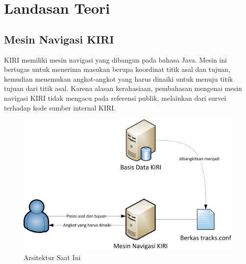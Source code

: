 \chapter{Landasan Teori}
\label{chap:pendahuluan}

\section{Mesin Navigasi KIRI}
\label{sec:mesin_navigasi_kiri}

KIRI memiliki mesin navigasi yang dibangun pada bahasa Java. Mesin ini bertugas
untuk menerima masukan berupa koordinat titik asal dan tujuan, kemudian
menemukan angkot-angkot yang harus dinaiki untuk menuju titik tujuan dari
titik asal. Karena alasan kerahasiaan, pembahasan mengenai mesin navigasi
KIRI tidak mengacu pada referensi publik, melainkan dari survei terhadap
kode sumber internal KIRI.

\begin{figure}
\centering
\includegraphics[scale=1]{Gambar/2_arsitektur_saat_ini}
\caption{Arsitektur Saat Ini} 
\end{figure}

